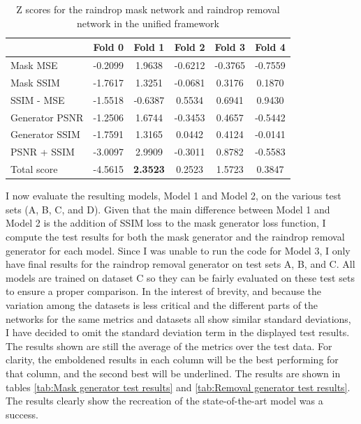 \documentclass[11pt]{ociamthesis}  %
\begin{document}
\renewcommand{\arraystretch}{1.3}    %
\setlength{\tabcolsep}{10pt}        %

\begin{table}[ht]
\centering
\begin{tabular}{|l|c|c|c|c|c|}
\hline
 & Fold 0 & Fold 1 & Fold 2 & Fold 3 & Fold 4 \\
\hline
Mask MSE & -0.2099 & 1.9638 & -0.6212 & -0.3765 & -0.7559 \\
\hline
Mask SSIM & -1.7617 & 1.3251 & -0.0681 & 0.3176 & 0.1870 \\
\hline
SSIM - MSE & -1.5518 & -0.6387 & 0.5534 & 0.6941 & 0.9430 \\
\hline
Generator PSNR & -1.2506 & 1.6744 & -0.3453 & 0.4657 & -0.5442 \\
\hline
Generator SSIM & -1.7591 & 1.3165 & 0.0442 & 0.4124 & -0.0141 \\
\hline
PSNR +  SSIM & -3.0097 & 2.9909 & -0.3011 & 0.8782 & -0.5583 \\
\hline
Total score & -4.5615 & \textbf{2.3523} & 0.2523 & 1.5723 & 0.3847 \\
\hline
\end{tabular}
\caption{Z scores for the raindrop mask network and raindrop removal network in the unified framework}
\label{tab:Z-scores for my model}
\end{table}

I now evaluate the resulting models, Model 1 and Model 2, on the various test sets (A, B, C, and D). Given that the main difference between Model 1 and Model 2 is the addition of SSIM loss to the mask generator loss function, I compute the test results for both the mask generator and the raindrop removal generator for each model. Since I was unable to run the code for Model 3, I only have final results for the raindrop removal generator on test sets A, B, and C. All models are trained on dataset C so they can be fairly evaluated on these test sets to ensure a proper comparison. In the interest of brevity, and because the variation among the datasets is less critical and the different parts of the networks for the same metrics and datasets all show similar standard deviations, I have decided to omit the standard deviation term in the displayed test results. The results shown are still the average of the metrics over the test data. For clarity, the emboldened results in each column will be the best performing for that column, and the second best will be underlined. The results are shown in tables \ref{tab:Mask generator test results} and \ref{tab:Removal generator test results}. The results clearly show the recreation of the state-of-the-art model was a success.
\end{document}
